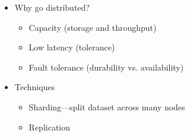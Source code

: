 \documentclass[10pt]{article}
\begin{document}
\begin{itemize}
\item Why go distributed?
\begin{itemize}
\item Capacity (storage and throughput)
\item Low latency (tolerance)
\item Fault tolerance (durability vs. availability)
\end{itemize}
\item Techniques
\begin{itemize}
\item Sharding---split dataset across many nodes
\item Replication
\end{itemize}
\end{itemize}
\end{document}
